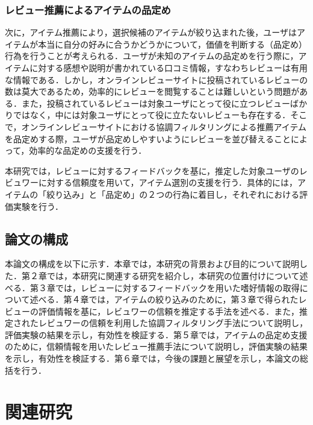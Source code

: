 \documentclass[a4paper,11pt,oneside,openany]{jsbook}
\begin{document}
\subsection{レビュー推薦によるアイテムの品定め}
次に，アイテム推薦により，選択候補のアイテムが絞り込まれた後，ユーザはアイテムが本当に自分の好みに合うかどうかについて，価値を判断する（品定め）行為を行うことが考えられる．ユーザが未知のアイテムの品定めを行う際に，アイテムに対する感想や説明が書かれている口コミ情報，すなわちレビューは有用な情報である．しかし，オンラインレビューサイトに投稿されているレビューの数は莫大であるため，効率的にレビューを閲覧することは難しいという問題がある．また，投稿されているレビューは対象ユーザにとって役に立つレビューばかりではなく，中には対象ユーザにとって役に立たないレビューも存在する．そこで，オンラインレビューサイトにおける協調フィルタリングによる推薦アイテムを品定めする際，ユーザが品定めしやすいようにレビューを並び替えることによって，効率的な品定めの支援を行う．
\par
本研究では，レビューに対するフィードバックを基に，推定した対象ユーザのレビュワーに対する信頼度を用いて，アイテム選別の支援を行う．具体的には，アイテムの「絞り込み」と「品定め」の２つの行為に着目し，それぞれにおける評価実験を行う．

	\section{論文の構成}
本論文の構成を以下に示す．本章では，本研究の背景および目的について説明した．第２章では，本研究に関連する研究を紹介し，本研究の位置付けについて述べる．第３章では，レビューに対するフィードバックを用いた嗜好情報の取得について述べる．第４章では，アイテムの絞り込みのために，第３章で得られたレビューの評価情報を基に，レビュワーの信頼を推定する手法を述べる．また，推定されたレビュワーの信頼を利用した協調フィルタリング手法について説明し，評価実験の結果を示し，有効性を検証する．第５章では，アイテムの品定め支援のために，信頼情報を用いたレビュー推薦手法について説明し，評価実験の結果を示し，有効性を検証する．第６章では，今後の課題と展望を示し，本論文の総括を行う．



\chapter{関連研究}
\end{document}
